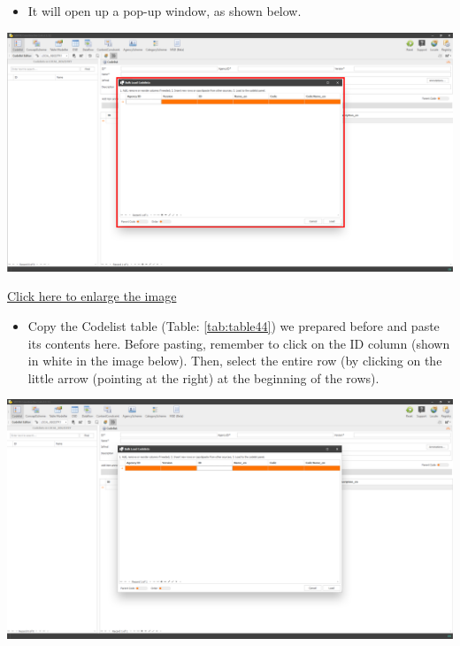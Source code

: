 \documentclass[
]{book}
\providecommand{\tightlist}{%
  \setlength{\itemsep}{0pt}\setlength{\parskip}{0pt}}
\begin{document}
\begin{itemize}
\tightlist
\item
  It will open up a pop-up window, as shown below.
\end{itemize}

\begin{center}\includegraphics[width=1\linewidth]{./images/image086} \end{center}

\href{images/image086.png}{Click here to enlarge the image}

\begin{itemize}
\tightlist
\item
  Copy the Codelist table (Table: \ref{tab:table44}) we prepared before and paste its contents here. Before pasting, remember to click on the ID column (shown in white in the image below). Then, select the entire row (by clicking on the little arrow (pointing at the right) at the beginning of the rows).
\end{itemize}

\begin{center}\includegraphics[width=1\linewidth]{./images/image088} \end{center}
\end{document}
